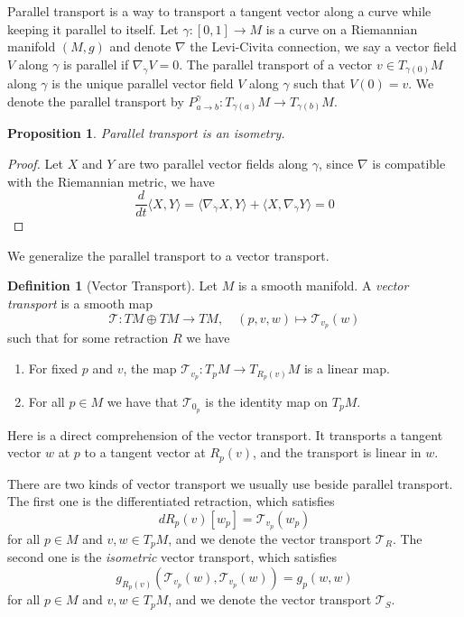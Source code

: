 \documentclass[12pt,a4paper,draft]{article}  %
\newtheorem{proposition}{Proposition}[section]
\theoremstyle{definition}
\newtheorem{definition}{Definition}[section]
\numberwithin{equation}{section}
\newcommand{\VT}{\mathcal{T}}
\begin{document}
Parallel transport is a way to transport a tangent vector along a curve while keeping it parallel to itself. Let $\gamma: [0,1] \to M$ is a curve on a Riemannian manifold $(M,g)$ and denote $\nabla$ the Levi-Civita connection, we say a vector field $V$ along $\gamma$ is parallel if $\nabla_{\dot{\gamma}} V = 0$. The parallel transport of a vector $v \in T_{\gamma(0)} M$ along $\gamma$ is the unique parallel vector field $V$ along $\gamma$ such that $V(0) = v$. We denote the parallel transport by $P^\gamma_{a\to b}: T_{\gamma(a)} M \to T_{\gamma(b)} M$. 
\begin{proposition}
        Parallel transport is an isometry.
\end{proposition}
\begin{proof}
        Let $X$ and $Y$ are two parallel vector fields along $\gamma$, since $\nabla$ is compatible with the Riemannian metric, we have
\[
\frac{d}{dt} \langle X, Y \rangle = \langle \nabla_{\dot{\gamma}} X, Y \rangle + \langle X, \nabla_{\dot{\gamma}} Y \rangle = 0
\]
\end{proof}
We generalize the parallel transport to a vector transport.
\begin{definition}[Vector Transport]
        Let $M$ is a smooth manifold. A \emph{vector transport} is a smooth map $$\VT: TM \oplus TM \to TM,\quad (p,v,w)\mapsto \VT_{v_p}(w)$$ such that for some retraction $R$ we have
        \begin{enumerate}
                \item For fixed $p$ and $v$, the map $\VT_{v_p}: T_p M \to T_{R_p(v)} M$ is a linear map.
                \item For all $p\in M$ we have that $\VT_{0_p}$ is the identity map on $T_p M$.
        \end{enumerate}
\end{definition}
Here is a direct comprehension of the vector transport. It transports a tangent vector $w$ at $p$ to a tangent vector at $R_p(v)$, and the transport is linear in $w$. 

There are two kinds of vector transport we usually use beside parallel transport. The first one is the differentiated retraction, which satisfies
\[
dR_p(v)[w_p] = \VT_{v_p}(w_p)
\]
for all $p\in M$ and $v,w \in T_p M$, and we denote the vector transport $\VT_R$. The second one is the \emph{isometric} vector transport, which satisfies
\[
g_{R_p(v)}(\VT_{v_p}(w), \VT_{v_p}(w)) = g_p(w,w)
\]
for all $p\in M$ and $v,w \in T_p M$, and we denote the vector transport $\VT_S$.
\end{document}
